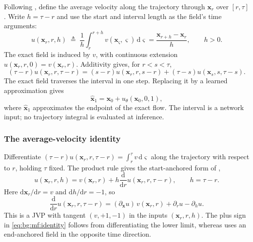 \documentclass[headsepline,footsepline,footinclude=false,oneside,fontsize=11pt,paper=a4,listof=totoc,bibliography=totoc]{scrbook}
\theoremstyle{definition}
\theoremstyle{plain}
\theoremstyle{remark}
\newcommand{\vect}[1]{\boldsymbol{#1}}
\newcommand{\dd}{\mathrm{d}}                   %
\newcommand{\vfield}{v}                        %
\newcommand{\afield}{u}                        %
\newcommand{\ftime}{\tau}                      %
\begin{document}
Following \parencite[Eq.~(3)]{geng2025meanflow}, define the average velocity along the trajectory
through $\vect{x}_{r}$ over $[r,\ftime]$. Write $h=\ftime-r$ and use the start and interval length
as the field's time arguments:
\begin{equation}\label{eq:bg:mf:def}
  \afield(\vect{x}_{r},r,h)
  \;\triangleq\; \frac{1}{h}\int_{r}^{r+h}
      \vfield(\vect{x}_{\varsigma},\varsigma)\,\dd\varsigma
  = \frac{\vect{x}_{r+h}-\vect{x}_{r}}{h},\qquad h>0.
\end{equation}
The exact field is induced by $\vfield$, with continuous extension
$\afield(\vect{x}_{r},r,0)=\vfield(\vect{x}_{r},r)$. Additivity gives, for $r<s<\ftime$,
\[
(\ftime-r)\afield(\vect{x}_{r},r,\ftime-r)
=(s-r)\afield(\vect{x}_{r},r,s-r)
 +(\ftime-s)\afield(\vect{x}_{s},s,\ftime-s).
\]
The exact field traverses the interval in one step. Replacing it by a learned approximation gives
\begin{equation}\label{eq:bg:mf:onestep}
  \hat{\vect{x}}_{1} = \vect{x}_{0}+\afield_{\theta}(\vect{x}_{0},0,1),
\end{equation}
where $\hat{\vect{x}}_{1}$ approximates the endpoint of the exact flow. The interval is a network
input; no trajectory integral is evaluated at inference.

\subsubsection*{The average-velocity identity}

Differentiate $(\ftime-r)\afield(\vect{x}_{r},r,\ftime-r)
=\int_{r}^{\ftime}\vfield\,\dd\varsigma$ along the trajectory with respect to $r$, holding
$\ftime$ fixed. The product rule gives the start-anchored form of
\parencite[Eqs.~(4)--(6)]{geng2025meanflow},
\begin{equation}\label{eq:bg:mf:identity}
  \afield(\vect{x}_{r},r,h)
  = \vfield(\vect{x}_{r},r)+h\frac{\dd}{\dd r}
      \afield(\vect{x}_{r},r,\ftime-r),\qquad h=\ftime-r.
\end{equation}
Here $\dd\vect{x}_{r}/\dd r=\vfield$ and $\dd h/\dd r=-1$, so
\begin{equation}\label{eq:bg:mf:jvp}
  \frac{\dd}{\dd r}\afield(\vect{x}_{r},r,\ftime-r)
  = (\partial_{\vect{x}}\afield)\,\vfield(\vect{x}_{r},r)
    +\partial_{r}\afield-\partial_{h}\afield.
\end{equation}
This is a \ac{JVP} with tangent $(\vfield,+1,-1)$ in the inputs $(\vect{x}_{r},r,h)$.
The plus sign in \eqref{eq:bg:mf:identity} follows from differentiating the lower limit, whereas
\parencite[Eq.~(6)]{geng2025meanflow} uses an end-anchored field in the opposite time direction.
\end{document}
